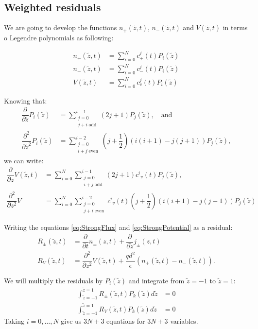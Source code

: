 \documentclass[amsmath,amsfonts,amssymb,superscriptaddress,showkeys,notitlepage,onecolumn]{revtex4-1}
\newcommand{\dpartial}[1]{\ensuremath{\dfrac{\partial}{\partial #1}}}
\newcommand{\ddpartial}[1]{\ensuremath{\dfrac{\partial^2}{\partial #1^2}}}
\newcommand{\Npm}{\ensuremath{n_{\pm}(z,t)}}
\newcommand{\Np}{\ensuremath{n_{+}(\tilde{z},t)}}
\newcommand{\Nm}{\ensuremath{n_{-}(\tilde{z},t)}}
\newcommand{\V}{\ensuremath{V(\tilde{z},t)}}
\newcommand{\legP}[1]{\ensuremath{P_{#1}(\tilde{z})}}
\newcommand{\jpm}{\ensuremath{j_{\pm}(z,t)}}
\begin{document}
\subsection{Weighted residuals}

We are going to develop the functions $\Np$, $\Nm$ and $\V$ in terms o Legendre polynomials as following:

\begin{align}\nonumber
  \Np&=\sum_{i=0}^N  c^j_{+}(t) \legP{i}\\
  \Nm&=\sum_{i=0}^N  c^j_{-}(t) \legP{i}\\ \nonumber
  \V&=\sum_{i=0}^N   c^j_{v}(t) \legP{i}
\end{align}


Knowing that:
\begin{align}\nonumber
  \dpartial{\tilde{z}} \legP{i}&=\sum_{\substack{j=0 \\  j+i \; \text{odd}}}^{i-1} (2j+1) \legP{j}, \quad \text{and}\\
  \ddpartial{\tilde{z}} \legP{i}&=\sum_{\substack{j=0 \\  i+j \; \text{even}}}^{i-2} \left(j+\dfrac{1}{2} \right) \left(i(i+1)-j(j+1) \right) \legP{j},
\end{align}
we can write:
\begin{align}\label{eq:ddV}\nonumber
  \dpartial{z} \V&=\sum_{i=0}^{N} \sum_{\substack{j=0 \\  i+j \; \text{odd}}}^{i-1} (2j+1) {c^i}_v(t) \legP{j},\\
\ddpartial{z}  V&=\sum_{i=0}^{N} \sum_{\substack{j=0 \\  j+i \; \text{even}}}^{i-2} {c^i}_v(t) \left(j+\dfrac{1}{2} \right) \left(i(i+1)-j(j+1) \right)  \legP{j}
\end{align}


Writing the equations \eqref{eq:StrongFlux} and \eqref{eq:StrongPotential} as a residual:
\begin{align}\label{eq:Residual}\nonumber
  R_{\pm}(\tilde{z},t)&= \dpartial{t} \Npm + \dpartial{\tilde{z}} \jpm\\
  R_{V}(\tilde{z},t)&= \ddpartial{z}  \V + \dfrac{q d^2}{\epsilon}(\Np-\Nm).
\end{align}

We will multiply the residuals by $P_i(\tilde{z})$ and integrate from $\tilde{z}=-1$ to $\tilde{z}=1$:
\begin{align}\nonumber \label{eq:residuals}
  \int_{\tilde{z}=-1}^{\tilde{z}=1} R_{\pm}(\tilde{z},t) P_k(\tilde{z}) d\tilde{z}&= 0\\
  \int_{\tilde{z}=-1}^{\tilde{z}=1} R_{V}(\tilde{z},t) P_k(\tilde{z}) d\tilde{z} &= 0
\end{align}
Taking $i=0,\ldots,N$ give us $3N+3$ equations for $3N+3$ variables.
\end{document}

